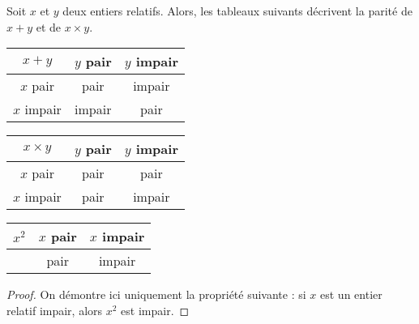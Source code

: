 \documentclass{article}
\begin{document}
\begin{proposition}
Soit $x$ et $y$ deux entiers relatifs. Alors, les tableaux suivants décrivent la parité de $x + y$ et de $x \times y$.
\vspace*{0.5cm}

\begin{minipage}{0.30\textwidth}
\begin{tabular}{|c|c|c|}
\hline
$x + y$&$y$ pair&$y$ impair\\
\hline
$x$ pair&pair& impair\\
\hline
$x$ impair& impair& pair\\
\hline
\end{tabular}    
\end{minipage}
\hfill
\begin{minipage}{0.30\textwidth}
\begin{tabular}{|c|c|c|}
\hline
$x \times y$&$y$ pair&$y$ impair\\
\hline
$x$ pair&pair& pair\\
\hline
$x$ impair& pair& impair\\
\hline
\end{tabular}    
\end{minipage}
\hfill
\begin{minipage}{0.30\textwidth}
\begin{tabular}{|c|c|c|}
\hline
$x^2$&$x$ pair&$x$ impair\\
\hline
&pair& impair\\
\hline
\end{tabular}    
\end{minipage}
\end{proposition}
\begin{proof}
On démontre ici uniquement la propriété suivante : si $x$ est un entier relatif impair, alors $x^2$ est impair.
\vspace*{0.5cm}

\emptybox{7cm}
\end{proof}
\end{document}
